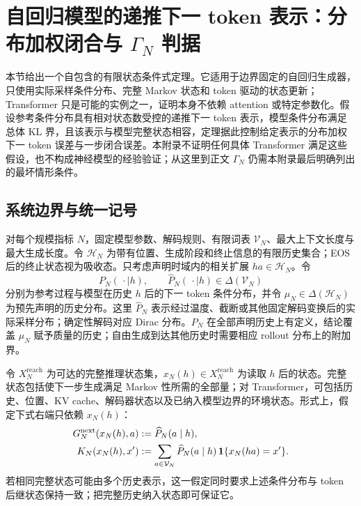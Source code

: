 \providecommand{\TransformerEquationPrefix}{\thesection}

\section{自回归模型的递推下一 token 表示：分布加权闭合与
\texorpdfstring{$\Gamma_N$}{Gamma-N} 判据}
\label{app:transformer-predictive-states}

本节给出一个自包含的有限状态条件式定理。它适用于边界固定的自回归生成器，只使用实际采样条件分布、完整 Markov 状态和 token 驱动的状态更新；Transformer\citep{VaswaniEtAl2017} 只是可能的实例之一，证明本身不依赖 attention 或特定参数化。假设参考条件分布具有相对状态数受控的递推下一 token 表示，模型条件分布满足总体 KL 界，且该表示与模型完整状态相容，定理据此控制给定表示的分布加权下一 token 误差与一步闭合误差。本附录不证明任何具体 Transformer 满足这些假设，也不构成神经模型的经验验证；从这里到正文 $\Gamma_N$ 仍需本附录最后明确列出的最坏情形条件。

\subsection{系统边界与统一记号}

对每个规模指标 $N$，固定模型参数、解码规则、有限词表 $\mathcal V_N$、最大上下文长度与最大生成长度。令 $\mathcal H_N$ 为带有位置、生成阶段和终止信息的有限历史集合；EOS 后的终止状态视为吸收态。只考虑声明时域内的相关扩展 $ha\in\mathcal H_N$。令
\[
 P_N(\,\cdot\mid h),\qquad \widehat P_N(\,\cdot\mid h)
 \in\Delta(\mathcal V_N)
\]
分别为参考过程与模型在历史 $h$ 后的下一 token 条件分布，并令 $\mu_N\in\Delta(\mathcal H_N)$ 为预先声明的历史分布。这里 $\widehat P_N$ 表示经过温度、截断或其他固定解码变换后的实际采样分布；确定性解码对应 Dirac 分布。$P_N$ 在全部声明历史上有定义，结论覆盖 $\mu_N$ 赋予质量的历史；自由生成到达其他历史时需要相应 rollout 分布上的附加界。

令 $X_N^{\mathrm{reach}}$ 为可达的完整推理状态集，$x_N(h)\in X_N^{\mathrm{reach}}$ 为读取 $h$ 后的状态。完整状态包括使下一步生成满足 Markov 性所需的全部量；对 Transformer，可包括历史、位置、KV cache、解码器状态以及已纳入模型边界的环境状态。形式上，假定下式右端只依赖 $x_N(h)$：
\[
 \begin{aligned}
 G_N^{\mathrm{next}}(x_N(h),a)
   &:=\widehat P_N(a\mid h),\\
 K_N(x_N(h),x')
   &:=\sum_{a\in\mathcal V_N}
      \widehat P_N(a\mid h)\,
      \mathbf 1\{x_N(ha)=x'\}.
 \end{aligned}
\]
若相同完整状态可能由多个历史表示，这一假定同时要求上述条件分布与 token 后继状态保持一致；把完整历史纳入状态即可保证它。

